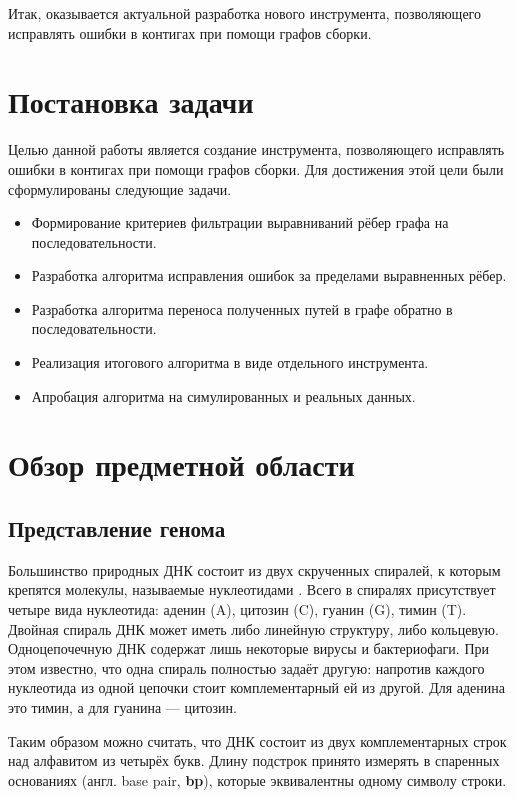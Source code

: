 \documentclass[14pt]{matmex-diploma-custom}
\begin{document}
Итак, оказывается актуальной разработка нового инструмента, позволяющего исправлять ошибки в контигах при помощи графов сборки.

\section{Постановка задачи}
Целью данной работы является создание инструмента, позволяющего исправлять ошибки в контигах при помощи графов сборки. Для достижения этой цели были сформулированы следующие задачи.
\begin{itemize}
    \item Формирование критериев фильтрации выравниваний рёбер графа на последовательности.
    \item Разработка алгоритма исправления ошибок за пределами выравненных рёбер.
    \item Разработка алгоритма переноса полученных путей в графе обратно в последовательности.
    \item Реализация итогового алгоритма в виде отдельного инструмента.
    \item Апробация алгоритма на симулированных и реальных данных.
\end{itemize}

\section{Обзор предметной области}
\subsection{Представление генома}
Большинство природных ДНК состоит из двух скрученных спиралей, к которым крепятся молекулы, называемые нуклеотидами \cite{art:Watson}. Всего в спиралях присутствует четыре вида нуклеотида: аденин (A), цитозин (C), гуанин (G), тимин (T). Двойная спираль ДНК может иметь либо линейную структуру, либо кольцевую. Одноцепочечную ДНК содержат лишь некоторые вирусы и бактериофаги. При этом известно, что одна спираль полностью задаёт другую: напротив каждого нуклеотида из одной цепочки стоит комплементарный ей из другой. Для аденина это тимин, а для гуанина --- цитозин.

Таким образом можно считать, что ДНК состоит из двух комплементарных строк над алфавитом из четырёх букв. Длину подстрок принято измерять в спаренных основаниях (англ. base pair, \textbf{bp}), которые эквивалентны одному символу строки.
\end{document}
